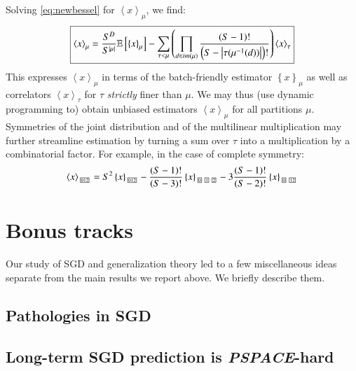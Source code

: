 \documentclass[openany, notitlepage, justified]{tufte-book}
\theoremstyle{plain}
\theoremstyle{definition}
\newcommand{\wrap}[1]{\left(#1\right)}
\newcommand{\wang}[1]{\left\langle#1\right\rangle}
\newcommand{\wabs}[1]{\left|#1\right|}
\newcommand{\wurl}[1]{\left\{#1\right\}}
\newcommand{\partitionbox}[1]{
    \text{
        \fboxsep=0.5pt
        \tiny
        \fbox{#1}
    }
}
\newcommand{\expct}[1]{\mathbb{E}\left[#1\right]}
\begin{document}
        Solving \ref{eq:newbessel} for $\wang{x}_\mu$, we find:
        \begin{equation*}
            \text{\fbox{$
            \wang{x}_\mu
            =
            \frac{S^D}{S^{\wabs{\mu}}}
            \expct{
                \wurl{x}_\mu
            }
            -
            \sum_{\tau < \mu} \wrap{
                \prod_{d\in im(\mu)}
                \frac{\wrap{S-1}!}{\wrap{S-\wabs{\tau(\mu^{-1}(d))}}!}
            }
            \wang{x}_\tau
            $}}
        \end{equation*}
        This expresses $\wang{x}_\mu$ in terms of the batch-friendly estimator
        $\wurl{x}_\mu$ as well as correlators $\wang{x}_\tau$ for $\tau$
        \emph{strictly} finer than $\mu$.  We may thus (use dynamic programming
        to) obtain unbiased estimators $\wang{x}_\mu$ for all partitions $\mu$.
        Symmetries of the joint distribution and of the multilinear
        multiplication may further streamline estimation by turning a sum over
        $\tau$ into a multiplication by a combinatorial factor.  For example,
        in the case of complete symmetry:
        $$
            \wang{x}_{\partitionbox{012}}
            =
            S^2
            \wurl{x}_{\partitionbox{012}}
            -
            \frac{(S-1)!}{(S-3)!}
            \wurl{x}_{\partitionbox{0}\partitionbox{1}\partitionbox{2}}
            -
            3\frac{(S-1)!}{(S-2)!}
            \wurl{x}_{\partitionbox{0}\partitionbox{12}}
        $$

\chapter{Bonus tracks}                   \label{appendix:bonus}

    Our study of SGD and generalization theory led to a few miscellaneous ideas
    separate from the main results we report above.  We briefly describe them.

    \section{Pathologies in SGD} \label{appendix:pathology}

    \section{Long-term SGD prediction is \emph{PSPACE}-hard} \label{appendix:pspace}
\end{document}
